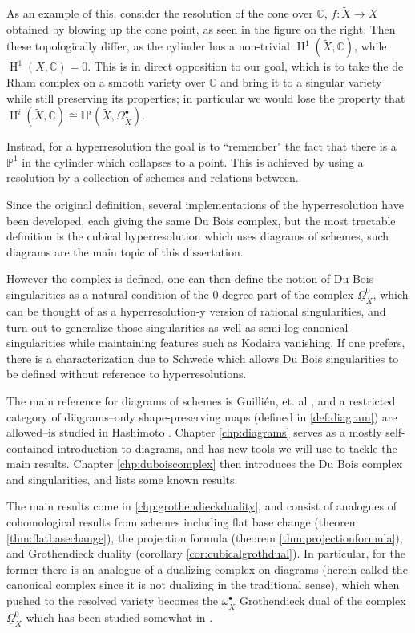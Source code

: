 \documentclass{report}
\theoremstyle{definition}
\DeclareMathOperator{\Ho}{H}
\newcommand{\CC}{\mathbb{C}}
\newcommand{\HH}{\mathbb{H}}
\newcommand{\PP}{\mathbb{P}}
\newcommand{\DB}{\underline{\Omega}}
\newcommand{\db}{\underline{\omega}^\bullet}
\begin{document}
As an example of this, consider the resolution of the cone over $\CC$, $f : \tilde{X} \rightarrow X$ obtained by blowing up the cone point, as seen in the figure on the right.
Then these topologically differ, as the cylinder has a non-trivial $\Ho^1 (\tilde{X}, \CC)$, while $\Ho^1 (X, \CC) = 0$.
This is in direct opposition to our goal, which is to take the de Rham complex on a smooth variety over $\CC$ and bring it to a singular variety while still preserving its properties; in particular we would lose the property that $\Ho^i ( \tilde{X}, \CC) \cong \HH^i (\tilde{X}, \Omega_{\tilde{X}}^\bullet)$.

Instead, for a hyperresolution the goal is to ``remember" the fact that there is a $\PP^1$ in the cylinder which collapses to a point.
This is achieved by using a resolution by a collection of schemes and relations between.

Since the original definition, several implementations of the hyperresolution have been developed, each giving the same Du Bois complex, but the most tractable definition is the cubical hyperresolution which uses diagrams of schemes, such diagrams are the main topic of this dissertation.

However the complex is defined, one can then define the notion of Du Bois singularities as a natural condition of the 0-degree part of the complex $\DB_X^0$, which can be thought of as a hyperresolution-y version of rational singularities, and turn out to generalize those singularities as well as semi-log canonical singularities while maintaining features such as Kodaira vanishing.
If one prefers, there is a characterization due to Schwede \cite{Schwede2007} which allows Du Bois singularities to be defined without reference to hyperresolutions.

The main reference for diagrams of schemes is Guilli\'en, et. al \cite{Guillen1988}, and a restricted category of diagrams--only shape-preserving maps (defined in \ref{def:diagram}) are allowed--is studied in Hashimoto \cite{Lipman2009}.
Chapter \ref{chp:diagrams} serves as a mostly self-contained introduction to diagrams, and has new tools we will use to tackle the main results.
Chapter \ref{chp:duboiscomplex} then introduces the Du Bois complex and singularities, and lists some known results.

The main results come in \ref{chp:grothendieckduality}, and consist of analogues of cohomological results from schemes including flat base change (theorem \ref{thm:flatbasechange}), the projection formula (theorem \ref{thm:projectionformula}), and Grothendieck duality (corollary \ref{cor:cubicalgrothdual}).
In particular, for the former there is an analogue of a dualizing complex on diagrams (herein called the canonical complex since it is not dualizing in the traditional sense), which when pushed to the resolved variety becomes the $\db_X$ Grothendieck dual of the complex $\DB_X^0$ which has been studied somewhat in \cite{Kovacs2011a}.
\end{document}
